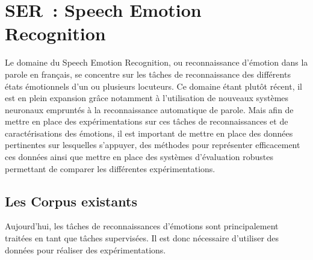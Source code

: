 \section{SER : Speech Emotion Recognition}
Le domaine du Speech Emotion Recognition, ou reconnaissance d'émotion dans la parole en français, se concentre sur les tâches de reconnaissance des différents états émotionnels d'un ou plusieurs locuteurs. Ce domaine étant plutôt récent, il est en plein expansion grâce notamment à l'utilisation de nouveaux systèmes neuronaux empruntés à la reconnaissance automatique de parole.
Mais afin de mettre en place des expérimentations sur ces tâches de reconnaissances et de caractérisations des émotions, il est important de mettre en place des données pertinentes sur lesquelles s'appuyer, des méthodes pour représenter efficacement ces données ainsi que mettre en place des systèmes d'évaluation robustes permettant de comparer les différentes expérimentations.

\subsection{Les Corpus existants}
Aujourd'hui, les tâches de reconnaissances d'émotions sont principalement traitées en tant que tâches supervisées. Il est donc nécessaire d'utiliser des données pour réaliser des expérimentations.

